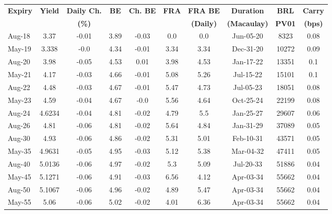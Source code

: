 \documentclass[article,crop=false]{standalone}%
\begin{document}
%
\normalsize%
\setlength{\tabcolsep}{0.15cm}%
\begin{tabular}[h]{l|c c|c c|c c|c c c}%
\hline%
\rowcolor{white}%
\textbf{Expiry}&\textbf{Yield}&\textbf{Daily Ch.}&\textbf{BE}&\textbf{Ch. BE}&\textbf{FRA}&\textbf{FRA BE}&\textbf{Duration}&\textbf{BRL}&\textbf{Carry}\\%
\rowcolor{white}%
\textbf{}&\textbf{}&\textbf{(\%)}&\textbf{}&\textbf{}&\textbf{}&\textbf{(Daily)}&\textbf{(Macaulay)}&\textbf{PV01}&\textbf{(bps)}\\%
\hline%
\rowcolor{lightgray}%
Aug{-}18&3.37&{-}0.01&3.89&{-}0.03&0.0&0.0&Jun{-}05{-}20&8323&0.08\\%
\rowcolor{white}%
May{-}19&3.338&{-}0.0&4.34&{-}0.01&3.34&3.34&Dec{-}31{-}20&10272&0.09\\%
\rowcolor{lightgray}%
Aug{-}20&3.98&{-}0.05&4.53&0.01&3.98&4.53&Jan{-}17{-}22&13351&0.1\\%
\rowcolor{white}%
May{-}21&4.17&{-}0.03&4.66&{-}0.01&5.08&5.26&Jul{-}15{-}22&15101&0.1\\%
\rowcolor{lightgray}%
Aug{-}22&4.48&{-}0.03&4.67&{-}0.01&5.47&4.73&Jul{-}05{-}23&18051&0.08\\%
\rowcolor{white}%
May{-}23&4.59&{-}0.04&4.67&{-}0.0&5.56&4.64&Oct{-}25{-}24&22199&0.08\\%
\rowcolor{lightgray}%
Aug{-}24&4.6234&{-}0.04&4.81&{-}0.02&4.79&5.5&Jan{-}25{-}27&29607&0.06\\%
\rowcolor{white}%
Aug{-}26&4.81&{-}0.06&4.81&{-}0.02&5.64&4.84&Jan{-}31{-}29&37089&0.05\\%
\rowcolor{lightgray}%
Aug{-}30&4.93&{-}0.06&4.86&{-}0.02&5.31&5.01&Feb{-}10{-}31&43571&0.05\\%
\rowcolor{white}%
May{-}35&4.9631&{-}0.05&4.95&{-}0.03&5.12&5.38&Mar{-}04{-}32&47411&0.05\\%
\rowcolor{lightgray}%
Aug{-}40&5.0136&{-}0.06&4.97&{-}0.02&5.3&5.09&Jul{-}20{-}33&51886&0.04\\%
\rowcolor{white}%
May{-}45&5.1271&{-}0.06&4.91&{-}0.03&6.56&4.12&Apr{-}03{-}34&55662&0.04\\%
\rowcolor{lightgray}%
Aug{-}50&5.1067&{-}0.06&4.96&{-}0.02&4.89&5.47&Apr{-}03{-}34&55662&0.04\\%
\rowcolor{white}%
May{-}55&5.06&{-}0.06&5.02&{-}0.02&4.01&6.36&Apr{-}03{-}34&55662&0.04\\%
\hline%
\end{tabular}%
\end{document}
